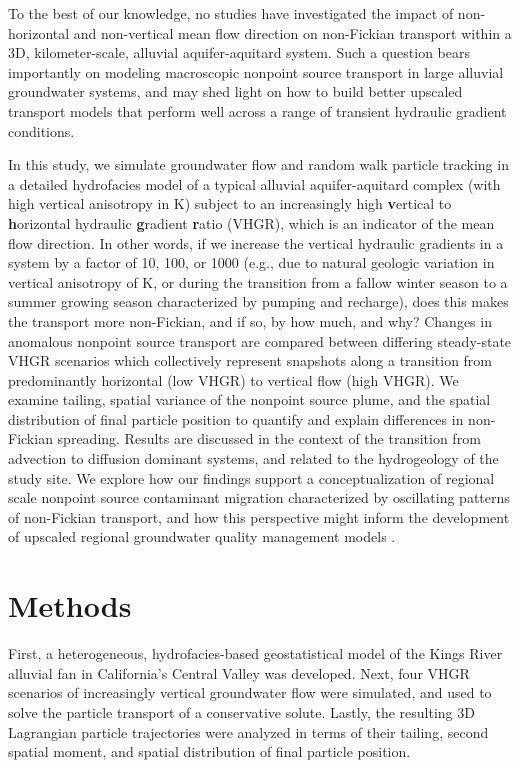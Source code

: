 To the best of our knowledge, no studies have investigated the impact of non-horizontal and non-vertical mean flow direction on non-Fickian transport within a 3D, kilometer-scale, alluvial aquifer-aquitard system. Such a question bears importantly on modeling macroscopic nonpoint source transport in large alluvial groundwater systems, and may shed light on how to build better upscaled transport models that perform well across a range of transient hydraulic gradient conditions.

In this study, we simulate groundwater flow and random walk particle tracking in a detailed hydrofacies model of a typical alluvial aquifer-aquitard complex (with high vertical anisotropy in K) subject to an increasingly high \textbf{v}ertical to \textbf{h}orizontal hydraulic \textbf{g}radient \textbf{r}atio (VHGR), which is an indicator of the mean flow direction. In other words, if we increase the vertical hydraulic gradients in a system by a factor of 10, 100, or 1000 (e.g., due to natural geologic variation in vertical anisotropy of K, or during the transition from a fallow winter season to a summer growing season characterized by pumping and recharge), does this makes the transport more non-Fickian, and if so, by how much, and why? Changes in anomalous nonpoint source transport are compared between differing steady-state VHGR scenarios which collectively represent snapshots along a transition from predominantly horizontal (low VHGR) to vertical flow (high VHGR). We examine tailing, spatial variance of the nonpoint source plume, and the spatial distribution of final particle position to quantify and explain differences in non-Fickian spreading. Results are discussed in the context of the transition from advection to diffusion dominant systems, and related to the hydrogeology of the study site. We explore how our findings support a conceptualization of regional scale nonpoint source contaminant migration characterized by oscillating patterns of non-Fickian transport, and how this perspective might inform the development of upscaled regional groundwater quality management models \citep{Fogg2006}.




\section{Methods}

First, a heterogeneous, hydrofacies-based geostatistical model of the Kings River alluvial fan in California's Central Valley was developed. Next, four VHGR scenarios of increasingly vertical groundwater flow were simulated, and used to solve the particle transport of a conservative solute. Lastly, the resulting 3D Lagrangian particle trajectories were analyzed in terms of their tailing, second spatial moment, and spatial distribution of final particle position. 

